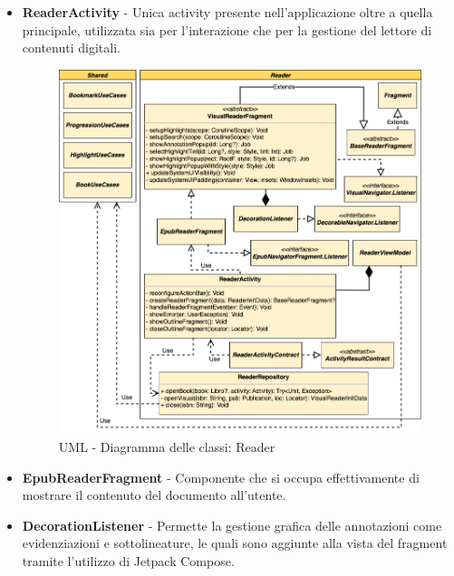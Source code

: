 \begin{itemize}
    \item \textbf{ReaderActivity} - Unica activity presente nell'applicazione oltre a quella principale, utilizzata sia per l’interazione che per la gestione del lettore di contenuti digitali.

    \begin{figure}[H]
        \centering
        \includegraphics[width=1\textwidth]{img/reader-uml.png}
        \caption{UML - Diagramma delle classi: Reader}
        \label{reader-uml}
    \end{figure}
    
    \item \textbf{EpubReaderFragment} - Componente che si occupa effettivamente di mostrare il contenuto del documento all'utente.
    
    \item \textbf{DecorationListener} - Permette la gestione grafica delle annotazioni come evidenziazioni e sottolineature, le quali sono aggiunte alla vista del fragment tramite l'utilizzo di Jetpack Compose.
\end{itemize}

\newpage
